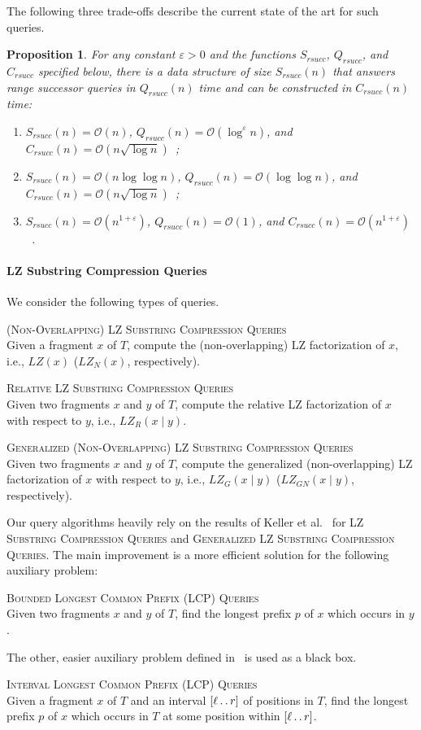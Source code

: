\documentclass[a4paper]{article}
\newtheorem{proposition}[theorem]{Proposition}
\theoremstyle{definition}
\theoremstyle{remark}
\newcommand{\BLCPFull}{\textsc{Bounded Longest Common Prefix (LCP) Queries}\xspace}
\newcommand{\ILCPFull}{\textsc{Interval Longest Common Prefix (LCP) Queries}\xspace}
\newcommand{\LSC}{\textsc{LZ Substring Compression Queries}\xspace}
\newcommand{\GSC}{\textsc{Generalized LZ Substring Compression Queries}\xspace}
\newcommand{\eps}{\varepsilon}
\newcommand{\dd}{\mathinner{\ldotp\ldotp}}
\newcommand{\Oh}{\mathcal{O}}
\newcommand{\rsucc}{\mathit{rsucc}}
\newenvironment{dsproblem}[1]
{\begin{center}\begin{lrbox}{\mybox}\begin{minipage}{0.96\columnwidth}{\textsc{#1}}\\}
{\end{minipage}\end{lrbox}\fbox{\usebox{\mybox}}\end{center}}
\newcommand{\defdsproblem}[2]{
  \begin{dsproblem}{#1}
#2
  \end{dsproblem}
  }
\begin{document}
The following three trade-offs describe the current state of the art for such queries.
\begin{proposition}\label{prp:range_successor_ub}
For any constant $\eps>0$ and the functions $S_{\rsucc}$, $Q_\rsucc$, and $C_\rsucc$ specified below, there is a data structure of size 
 $S_{\rsucc}(n)$ that answers range successor queries in $Q_\rsucc(n)$ time and can be constructed in $C_\rsucc(n)$ time:
 \begin{enumerate}[label=(\alph*)]
   \item\label{it:succn} $S_{\rsucc}(n)=\Oh(n)$, $Q_{\rsucc}(n)=\Oh(\log^{\eps}{n})$,
   and $C_\rsucc(n)=\Oh(n\sqrt{\log n})$~\cite{DBLP:conf/swat/NekrichN12,DBLP:conf/soda/BelazzouguiP16};
   \item\label{it:succloglog} $S_{\rsucc}(n)=\Oh(n\log\log n)$, $Q_{\rsucc}(n)=\Oh(\log\log n)$, and $C_\rsucc(n)=\Oh(n\sqrt{\log n})$~\cite{DBLP:journals/ipl/Zhou16,Gao2020};
   \item\label{it:succeps} $S_{\rsucc}(n)=\Oh(n^{1+\eps})$, $Q_{\rsucc}(n)=\Oh(1)$,
   and $C_\rsucc(n)=\Oh(n^{1+\eps})$~\cite{DBLP:journals/tcs/CrochemoreIKRTW12}.
 \end{enumerate}
\end{proposition}


\paragraph{LZ Substring Compression Queries}
We consider the following types of queries.
\defdsproblem{\textsc{(Non-Overlapping) LZ Substring Compression Queries}}{
Given a fragment $x$ of $T$, compute the (non-overlapping) LZ factorization of $x$, i.e., $LZ(x)$ ($LZ_N(x)$, respectively).
}
\defdsproblem{\textsc{Relative LZ Substring Compression Queries}}{
Given two fragments $x$ and $y$ of $T$, compute the relative LZ factorization of $x$ with respect to $y$, i.e., $LZ_R(x \mid y)$.
}

\defdsproblem{\textsc{Generalized (Non-Overlapping) LZ Substring Compression Queries}}{
Given two fragments $x$ and $y$ of $T$, compute the generalized (non-overlapping) LZ factorization of $x$ with respect to $y$, i.e., $LZ_G(x \mid y)$
($LZ_{GN}(x \mid y)$, respectively).
}

Our query algorithms heavily rely on the results of Keller et al.~\cite{DBLP:journals/tcs/KellerKFL14} for \LSC and \GSC. 
The main improvement is a more efficient solution for the following auxiliary problem:
\defdsproblem{\BLCPFull}{Given two fragments $x$ and $y$ of $T$, find the longest prefix $p$ of $x$ which  occurs in $y$.}
The other, easier auxiliary problem defined in~\cite{DBLP:journals/tcs/KellerKFL14} is used as a black box.
\defdsproblem{\ILCPFull}{Given a fragment $x$ of $T$ and an interval $[\ell\dd r]$ of positions in $T$, 
find the longest prefix $p$ of $x$ which occurs in $T$  at some position within $[\ell\dd r]$.}
\end{document}
